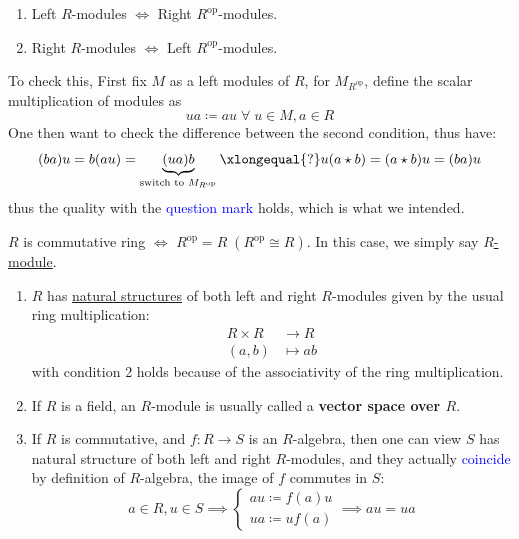 \begin{remark}
	\leavevmode
	\begin{enumerate}
		\item Left \( R \)-modules \( \iff \) Right \( R^{\text{op}} \)-modules.
		\item Right \( R \)-modules \( \iff \) Left \( R^{\text{op}} \)-modules.
	\end{enumerate}
\end{remark}
To check this, First fix \( M \) as a left modules of \( R \), for \( M_{R^{\text{op}}} \), define the scalar multiplication of modules as
\[
	ua \coloneqq  au \; \forall \; u\in M, a\in R
\]
One then want to check the difference between the second condition, thus have:
\[
	(ba) u = b(au) = \underbrace{(ua) b}_{\text{switch to }M_{R^{\text{op}}}} \xlongequal{?} u(a\star b)
	= (a\star b) u = (ba) u
\]
thus the quality with the \textcolor{blue}{question mark} holds, which is what we intended.

\begin{remark}
	\( R \) is commutative ring \( \iff \) \( R^{\text{op}} = R \; (R^{\text{op}} \cong R)\). In this
	case, we simply say \underline{\( R \)-module}.
\end{remark}

\begin{eg}
	\leavevmode
	\begin{enumerate}
		\item \( R \) has \underline{natural structures} of both left and right \( R \)-modules given by
		      the usual ring multiplication:
		      \begin{align*}
			      R\times R & \to R      \\
			      (a,b)     & \mapsto ab
		      \end{align*}
		      with condition 2 holds because of the associativity of the ring multiplication.
		\item If \( R \) is a field, an \( R \)-module is usually called a \textbf{vector space over
			      \( R \)}.
		\item If \( R \) is commutative, and \( f: R\to S \) is an \( R \)-algebra, then one can
		      view \( S \) has natural structure of both left and right \( R \)-modules, and they
		      actually \textcolor{blue}{coincide} by definition of \( R \)-algebra, the image of \( f \) commutes in \(
		      S\):
		      \[
			      a\in R, u\in S \implies \begin{cases}
				      au \coloneqq f(a) u \\
				      ua \coloneqq  uf(a)
			      \end{cases}
			      \implies au = ua
		      \]
	\end{enumerate}
\end{eg}

